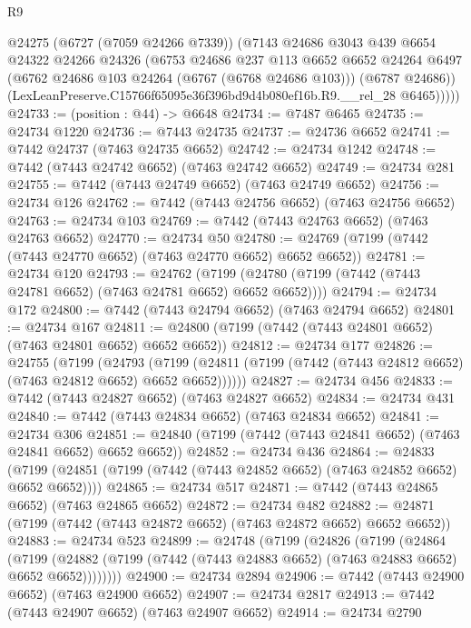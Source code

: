\begin{lexlean}{R9}
\begin{coremodule}
          @24275
          (@6727 (@7059 @24266 @7339))
          (@7143
            @24686
            @3043
            @439
            @6654
            @24322
            @24266
            @24326
            (@6753
              @24686
              @237
              @113
              @6652
              @6652
              @24264
              @6497
              (@6762 @24686 @103 @24264 (@6767 (@6768 @24686 @103)))
              (@6787 @24686))
            (LexLeanPreserve.C15766f65095e36f396bd9d4b080ef16b.R9.__rel_28 @6465)))))
@24733 := (position : @44) -> @6648
@24734 := @7487 @6465
@24735 := @24734 @1220
@24736 := @7443 @24735
@24737 := @24736 @6652
@24741 := @7442 @24737 (@7463 @24735 @6652)
@24742 := @24734 @1242
@24748 := @7442 (@7443 @24742 @6652) (@7463 @24742 @6652)
@24749 := @24734 @281
@24755 := @7442 (@7443 @24749 @6652) (@7463 @24749 @6652)
@24756 := @24734 @126
@24762 := @7442 (@7443 @24756 @6652) (@7463 @24756 @6652)
@24763 := @24734 @103
@24769 := @7442 (@7443 @24763 @6652) (@7463 @24763 @6652)
@24770 := @24734 @50
@24780 := @24769 (@7199 (@7442 (@7443 @24770 @6652) (@7463 @24770 @6652) @6652 @6652))
@24781 := @24734 @120
@24793 := @24762
    (@7199 (@24780 (@7199 (@7442 (@7443 @24781 @6652) (@7463 @24781 @6652) @6652 @6652))))
@24794 := @24734 @172
@24800 := @7442 (@7443 @24794 @6652) (@7463 @24794 @6652)
@24801 := @24734 @167
@24811 := @24800 (@7199 (@7442 (@7443 @24801 @6652) (@7463 @24801 @6652) @6652 @6652))
@24812 := @24734 @177
@24826 := @24755
    (@7199
      (@24793
        (@7199 (@24811 (@7199 (@7442 (@7443 @24812 @6652) (@7463 @24812 @6652) @6652 @6652))))))
@24827 := @24734 @456
@24833 := @7442 (@7443 @24827 @6652) (@7463 @24827 @6652)
@24834 := @24734 @431
@24840 := @7442 (@7443 @24834 @6652) (@7463 @24834 @6652)
@24841 := @24734 @306
@24851 := @24840 (@7199 (@7442 (@7443 @24841 @6652) (@7463 @24841 @6652) @6652 @6652))
@24852 := @24734 @436
@24864 := @24833
    (@7199 (@24851 (@7199 (@7442 (@7443 @24852 @6652) (@7463 @24852 @6652) @6652 @6652))))
@24865 := @24734 @517
@24871 := @7442 (@7443 @24865 @6652) (@7463 @24865 @6652)
@24872 := @24734 @482
@24882 := @24871 (@7199 (@7442 (@7443 @24872 @6652) (@7463 @24872 @6652) @6652 @6652))
@24883 := @24734 @523
@24899 := @24748
    (@7199
      (@24826
        (@7199
          (@24864
            (@7199
              (@24882 (@7199 (@7442 (@7443 @24883 @6652) (@7463 @24883 @6652) @6652 @6652))))))))
@24900 := @24734 @2894
@24906 := @7442 (@7443 @24900 @6652) (@7463 @24900 @6652)
@24907 := @24734 @2817
@24913 := @7442 (@7443 @24907 @6652) (@7463 @24907 @6652)
@24914 := @24734 @2790

\end{coremodule}
\end{lexlean}
